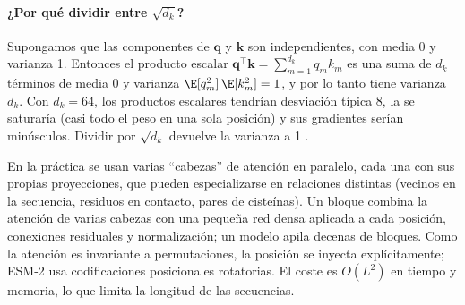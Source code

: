 \begin{simbolos}
\end{simbolos}

\paragraph{¿Por qué dividir entre $\sqrt{d_k}$?} Supongamos que las componentes de $\mathbf{q}$ y $\mathbf{k}$ son independientes, con media 0 y varianza 1. Entonces el producto escalar $\mathbf{q}^\top\mathbf{k}=\sum_{m=1}^{d_k}q_mk_m$ es una suma de $d_k$ términos de media 0 y varianza $\E[q_m^2]\,\E[k_m^2]=1$, y por lo tanto tiene varianza $d_k$. Con $d_k=64$, los productos escalares tendrían desviación típica 8, la  se saturaría (casi todo el peso en una sola posición) y sus gradientes serían minúsculos. Dividir por $\sqrt{d_k}$ devuelve la varianza a 1 \parencite{c17-vaswani2017}.

En la práctica se usan varias ``cabezas'' de atención en paralelo, cada una con sus propias proyecciones, que pueden especializarse en relaciones distintas (vecinos en la secuencia, residuos en contacto, pares de cisteínas). Un bloque  combina la atención de varias cabezas con una pequeña red densa aplicada a cada posición, conexiones residuales y normalización; un modelo apila decenas de bloques. Como la atención es invariante a permutaciones, la posición se inyecta explícitamente; ESM-2 usa codificaciones posicionales rotatorias. El coste es $O(L^2)$ en tiempo y memoria, lo que limita la longitud de las secuencias.


